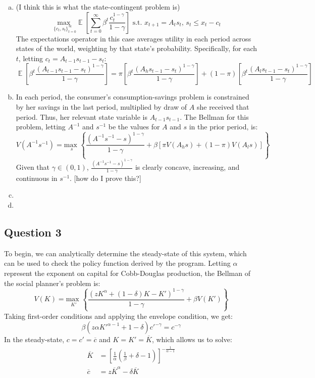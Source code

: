 \documentclass{article}
\newcommand{\usmax}[1]{\underset{#1}{\text{max }}}
\newcommand{\zinf}{_{t=0}^\infty}
\newcommand{\aneg}{A^{-1}}
\newcommand{\sneg}{s^{-1}}
\DeclareMathOperator{\E}{\mathbb{E}} %
\begin{document}
\begin{enumerate}[(a)]
	\item (I think this is what the state-contingent problem is)
		\[
			\usmax{\{c_t,s_t\}\zinf}\E\left[\sum\zinf\beta^t\frac{c_t^{1-\gamma}}{1-\gamma}\right]\text{ s.t. }x_{t+1}= A_ts_t\text{, }s_t\leq x_t-c_t
		\]
		The expectations operator in this case averages utility in each period across states of the world, weighting by that state's probability. Specifically, for each $t$, letting $c_t = A_{t-1}s_{t-1} - s_t$:
		\[
			\E\left[\beta^t\frac{(A_{t-1}s_{t-1} - s_t)^{1-\gamma}}{1-\gamma}\right] = \pi\left[\beta^t\frac{(A_hs_{t-1} - s_t)^{1-\gamma}}{1-\gamma}\right] + (1-\pi)\left[\beta^t\frac{(A_ls_{t-1} - s_t)^{1-\gamma}}{1-\gamma}\right] 
		\]
		
	\item In each period, the consumer's consumption-savings problem is constrained by her savings in the last period, multiplied by draw of $A$ she received that period. Thus, her relevant state variable is $A_{t-1}s_{t-1}$. The Bellman for this problem, letting $A^{-1}$ and $s^{-1}$ be the values for $A$ and $s$ in the prior period, is:
		\[
			V(A^{-1}s^{-1}) = \usmax{s}\left\{ \frac{\left(\aneg\sneg-s\right)^{1-\gamma}}{1-\gamma} + \beta\left[\pi V(A_hs) + (1-\pi)V(A_ls)\right] \right\}
		\]
		Given that $\gamma\in(0,1)$, $\frac{\left(\aneg\sneg-s\right)^{1-\gamma}}{1-\gamma}$ is clearly concave, increasing, and continuous in $\sneg$. [how do I prove this?]
	
	\item 
	
	\item 
	
\end{enumerate}

\subsection*{Question 3}
To begin, we can analytically determine the steady-state of this system, which can be used to check the policy function derived by the program. Letting $\alpha$ represent the exponent on capital for Cobb-Douglas production, the Bellman of the social planner's problem is:
\[
	V(K) = \usmax{K'}\left\{\frac{\left(zK^\alpha + (1-\delta)K -K'\right)^{1-\gamma}}{1-\gamma} + \beta V(K')\right\}
\]
Taking first-order conditions and applying the envelope condition, we get:
\[
	\beta\left(z\alpha K'^{\alpha-1}+1-\delta\right)c'^{-\gamma} = c^{-\gamma}
\]
In the steady-state, $c=c'=\overline{c}$ and $K=K'=\overline{K}$, which allows us to solve:
\begin{align*}
	\overline{K} &= \left[\frac{1}{\alpha}\left(\frac{1}{\beta} + \delta - 1\right)\right]^{-\frac{1}{\alpha-1}}	\\
	\overline{c} &= z\overline{K}^\alpha - \delta\overline{K}
\end{align*}
\end{document}

